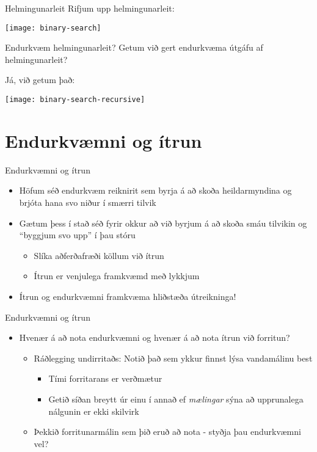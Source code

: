 \documentclass[handout]{beamer}
\begin{document}
\begin{frame}{Helmingunarleit}
Rifjum upp helmingunarleit:
\begin{center}
\texttt{[image: binary-search]}
\end{center}
\end{frame}

\begin{frame}{Endurkvæm helmingunarleit?}
Getum við gert endurkvæma útgáfu af helmingunarleit?\pause

Já, við getum það:
\begin{center}
\texttt{[image: binary-search-recursive]}
\end{center}
\end{frame}

\section{Endurkvæmni og ítrun}

\begin{frame}{Endurkvæmni og ítrun}
\begin{itemize}
 \item Höfum séð endurkvæm reiknirit sem byrja á að skoða heildarmyndina og brjóta hana svo niður í smærri tilvik
 \item Gætum þess í stað séð fyrir okkur að við byrjum á að skoða smáu tilvikin og ``byggjum svo upp'' í þau stóru
 \begin{itemize}
  \item Slíka aðferðafræði köllum við ítrun
  \item Ítrun er venjulega framkvæmd með lykkjum
 \end{itemize}
 \item Ítrun og endurkvæmni framkvæma hliðstæða útreikninga!
\end{itemize}
\end{frame}

\begin{frame}{Endurkvæmni og ítrun}
\begin{itemize}
 \item Hvenær á að nota endurkvæmni og hvenær á að nota ítrun við forritun? \pause
 \begin{itemize}
  \item Ráðlegging undirritaðs: Notið það sem ykkur finnst lýsa vandamálinu best
  \begin{itemize}
   \item Tími forritarans er verðmætur
   \item Getið síðan breytt úr einu í annað ef \emph{mælingar} sýna að upprunalega nálgunin er ekki skilvirk
  \end{itemize}
  \item Þekkið forritunarmálin sem þið eruð að nota - styðja þau endurkvæmni vel?
 \end{itemize}
\end{itemize}
\end{frame}
\end{document}
